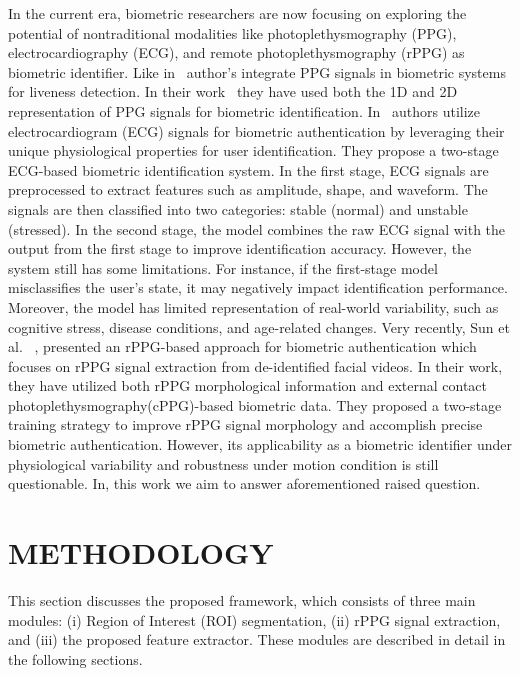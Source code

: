  In the current era, biometric researchers are now focusing on exploring the potential of nontraditional modalities like photoplethysmography (PPG), electrocardiography (ECG), and remote photoplethysmography (rPPG) as biometric identifier. Like in~\cite{cherry2024optimizing} author's integrate PPG signals in biometric systems for liveness detection. In their work~\cite{cherry2024optimizing} they have used both the 1D and 2D representation of PPG signals for biometric identification. In~\cite{kim2025utilization} authors utilize electrocardiogram (ECG) signals for biometric authentication by leveraging their unique physiological properties for user identification. They propose a two-stage ECG-based biometric identification system. In the first stage, ECG signals are preprocessed to extract features such as amplitude, shape, and waveform. The signals are then classified into two categories: stable (normal) and unstable (stressed). In the second stage, the model combines the raw ECG signal with the output from the first stage to improve identification accuracy. However, the system still has some limitations. For instance, if the first-stage model misclassifies the user's state, it may negatively impact identification performance. Moreover, the model has limited representation of real-world variability, such as cognitive stress, disease conditions, and age-related changes. Very recently, Sun et al. ~\cite{sun2024biometric},  presented an rPPG-based approach for biometric authentication  which focuses on rPPG signal extraction from de-identified facial videos. In their work, they have  utilized  both rPPG morphological information and external contact photoplethysmography(cPPG)-based biometric data. They proposed  a two-stage training strategy to improve rPPG signal morphology and accomplish precise biometric authentication. However, its applicability as a biometric identifier under physiological variability and robustness under motion condition is still questionable. In, this work we aim to answer aforementioned raised question.






\section{METHODOLOGY}

This section discusses the proposed framework, which consists of three main modules: (i) Region of Interest (ROI) segmentation, (ii) rPPG signal extraction, and (iii) the proposed feature extractor. These modules are described in detail in the following sections.

